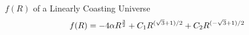 \documentclass[final,hyperref={pdfpagelabels=false}]{beamer}
\begin{document}
\begin{frame}[t]
\begin{columns}[t]
\begin{column}{.465\textwidth}
\begin{block}{$f(R)$ of a Linearly Coasting Universe}
\begin{equation}
f(R)=-4\alpha R^{{3 \over 2}}+C_1R^{(\sqrt{3}+1)/2}+C_2R^{(-\sqrt{3}+1)/2}\label{fR2}
\end{equation}

%
%
%
%
%
%
%
%

%



\end{block}
\end{column}
\end{columns}
\end{frame}
\end{document}
